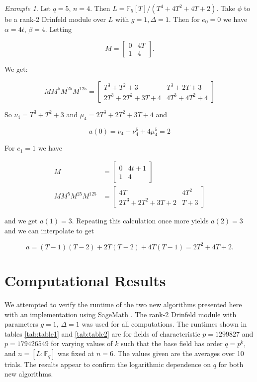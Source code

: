 \documentclass{acmart}
\theoremstyle{remark}
\numberwithin{equation}{section}
\newtheorem{example}{Example}
\begin{document}
\begin{example}
Let $q = 5$, $n = 4$. Then $L = \mathbb{F}_5[T]/(T^4 + 4T^2 + 4T + 2)$. Take $\phi$ to be a rank-2 Drinfeld module over $L$ with $g = 1, \Delta = 1$. Then for $e_0 = 0$ we have $\alpha = 4t$, $\beta = 4$. Letting

\[M = \begin{bmatrix}0 & 4T \\ 1 & 4 \end{bmatrix}.\]

\noindent We get:

\[M M^{5} M^{25} M^{125} = \begin{bmatrix} T^3 + T^2 + 3 & T^3 + 2T + 3 \\ 2T^3 + 2T^2 + 3T + 4 & 4T^3 + 4T^2 + 4 \end{bmatrix}\]

\noindent So $\nu_4 = T^3 + T^2 + 3$ and $\mu_4 = 2T^3 + 2T^2 + 3T + 4$ and

\[a(0) = \nu_4 + \nu_4^5 + 4\mu_4^5 = 2\]

\noindent For $e_1 = 1$ we have 

\begin{align*}
M & = \begin{bmatrix}0 & 4t + 1 \\ 1 & 4 \end{bmatrix}\\
M M^{5} M^{25} M^{125} & = \begin{bmatrix} 4T & 4T^2 \\ 2T^3 + 2T^2 + 3T + 2 & T+3 \end{bmatrix}
\end{align*}

\noindent and we get $a(1) = 3$. Repeating this calculation once more yields $a(2) = 3$ and we can interpolate to get

\[a = (T-1)(T-2) + 2T(T-2) + 4T(T-1)   = 2T^2 + 4T + 2.\]

\end{example}

\section{Computational Results}

We attempted to verify the runtime of the two new algorithms presented here with an implementation using SageMath \cite{sagemath}. The rank-2 Drinfeld module with parameters $g = 1$, $\Delta = 1$ was used for all computations. The runtimes shown in tables \ref{tab:table1} and \ref{tab:table2} are for fields of characteristic $ p= 1299827$ and $ p = 179426549$ for varying values of $k$ such that the base field has order $q = p^k$, and $n = [L: \mathbb{F}_q]$ was fixed at $ n = 6$. The values given are the averages over 10 trials. The results appear to confirm the logarithmic dependence on $q$ for both new algorithms. 
\end{document}
